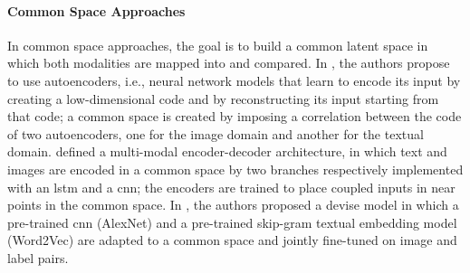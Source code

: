 \paragraph{Common Space Approaches}
In common space approaches, the goal is to build a common latent space in which both modalities are mapped into and compared.
In \cite{ngiam2011multimodal,feng2014cross}, the authors propose to use autoencoders, i.e., neural network models that learn to encode its input by creating a low-dimensional code and by reconstructing its input starting from that code;
a common space is created by imposing a correlation between the code of two autoencoders, one for the image domain and another for the textual domain.
\citet{kiros2014unifying} defined a multi-modal encoder-decoder architecture, in which text and images are encoded in a common space by two branches respectively implemented with an \gls{lstm} and a \gls{cnn};
the encoders are trained to place coupled inputs in near points in the common space.
%
In \cite{frome2013devise}, the authors proposed a \gls{devise} model in which a pre-trained \gls{cnn} (AlexNet) and a pre-trained skip-gram textual embedding model (Word2Vec) are adapted to a common space and jointly fine-tuned on image and label pairs.


